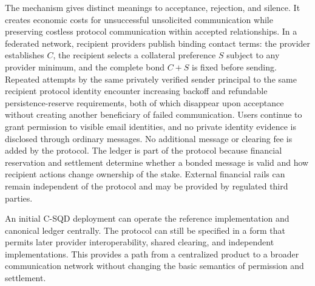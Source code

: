 \documentclass[11pt]{article}
\begin{document}
The mechanism gives distinct meanings to acceptance, rejection, and silence. It creates economic costs for unsuccessful unsolicited communication while preserving costless protocol communication within accepted relationships. In a federated network, recipient providers publish binding contact terms: the provider establishes $C$, the recipient selects a collateral preference $S$ subject to any provider minimum, and the complete bond $C+S$ is fixed before sending. Repeated attempts by the same privately verified sender principal to the same recipient protocol identity encounter increasing backoff and refundable persistence-reserve requirements, both of which disappear upon acceptance without creating another beneficiary of failed communication. Users continue to grant permission to visible email identities, and no private identity evidence is disclosed through ordinary messages. No additional message or clearing fee is added by the protocol. The ledger is part of the protocol because financial reservation and settlement determine whether a bonded message is valid and how recipient actions change ownership of the stake. External financial rails can remain independent of the protocol and may be provided by regulated third parties.

An initial C-SQD deployment can operate the reference implementation and canonical ledger centrally. The protocol can still be specified in a form that permits later provider interoperability, shared clearing, and independent implementations. This provides a path from a centralized product to a broader communication network without changing the basic semantics of permission and settlement.
\end{document}
